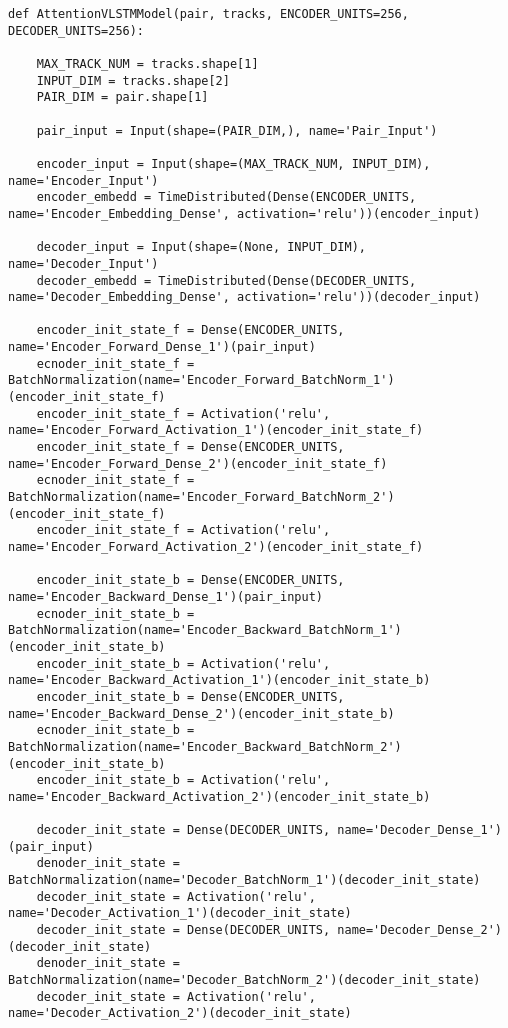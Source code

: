 \begin{lstlisting}[caption=独自のAttention LSTM, label=DedicatedAttentionLSTM]
def AttentionVLSTMModel(pair, tracks, ENCODER_UNITS=256, DECODER_UNITS=256):

    MAX_TRACK_NUM = tracks.shape[1]
    INPUT_DIM = tracks.shape[2]
    PAIR_DIM = pair.shape[1]

    pair_input = Input(shape=(PAIR_DIM,), name='Pair_Input')

    encoder_input = Input(shape=(MAX_TRACK_NUM, INPUT_DIM), name='Encoder_Input')
    encoder_embedd = TimeDistributed(Dense(ENCODER_UNITS, name='Encoder_Embedding_Dense', activation='relu'))(encoder_input)

    decoder_input = Input(shape=(None, INPUT_DIM), name='Decoder_Input')
    decoder_embedd = TimeDistributed(Dense(DECODER_UNITS, name='Decoder_Embedding_Dense', activation='relu'))(decoder_input)

    encoder_init_state_f = Dense(ENCODER_UNITS, name='Encoder_Forward_Dense_1')(pair_input)
    ecnoder_init_state_f = BatchNormalization(name='Encoder_Forward_BatchNorm_1')(encoder_init_state_f)
    encoder_init_state_f = Activation('relu', name='Encoder_Forward_Activation_1')(encoder_init_state_f)
    encoder_init_state_f = Dense(ENCODER_UNITS, name='Encoder_Forward_Dense_2')(encoder_init_state_f)
    ecnoder_init_state_f = BatchNormalization(name='Encoder_Forward_BatchNorm_2')(encoder_init_state_f)
    encoder_init_state_f = Activation('relu', name='Encoder_Forward_Activation_2')(encoder_init_state_f)

    encoder_init_state_b = Dense(ENCODER_UNITS, name='Encoder_Backward_Dense_1')(pair_input)
    ecnoder_init_state_b = BatchNormalization(name='Encoder_Backward_BatchNorm_1')(encoder_init_state_b)
    encoder_init_state_b = Activation('relu', name='Encoder_Backward_Activation_1')(encoder_init_state_b)
    encoder_init_state_b = Dense(ENCODER_UNITS, name='Encoder_Backward_Dense_2')(encoder_init_state_b)
    ecnoder_init_state_b = BatchNormalization(name='Encoder_Backward_BatchNorm_2')(encoder_init_state_b)
    encoder_init_state_b = Activation('relu', name='Encoder_Backward_Activation_2')(encoder_init_state_b)

    decoder_init_state = Dense(DECODER_UNITS, name='Decoder_Dense_1')(pair_input)
    denoder_init_state = BatchNormalization(name='Decoder_BatchNorm_1')(decoder_init_state)
    decoder_init_state = Activation('relu', name='Decoder_Activation_1')(decoder_init_state)
    decoder_init_state = Dense(DECODER_UNITS, name='Decoder_Dense_2')(decoder_init_state)
    denoder_init_state = BatchNormalization(name='Decoder_BatchNorm_2')(decoder_init_state)
    decoder_init_state = Activation('relu', name='Decoder_Activation_2')(decoder_init_state)


\end{lstlisting}
